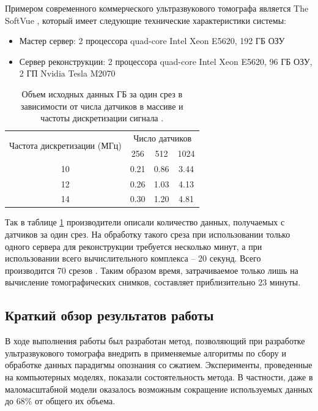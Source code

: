 \documentclass[14pt]{matmex-diploma-custom}
\begin{document}
Примером современного коммерческого ультразвукового томографа является The SoftVue \cite{roy2013breast}, который имеет следующие технические характеристики системы:
\begin{itemize}
\item Мастер сервер: 2 процессора quad-core Intel Xeon E5620, 192 ГБ ОЗУ
\item Сервер реконструкции: 2 процессора quad-core Intel Xeon E5620, 96 ГБ ОЗУ, 2 ГП Nvidia Tesla M2070
\end{itemize}

\begin{table}[h]
\centering
\begin{tabular}{ c | c | c | c }
    \hline
    \multirow{2}{*}{Частота дискретизации (МГц)} & \multicolumn{3}{c}{Число датчиков}  \\ \cline{2-4}
    & 256 & 512 & 1024 \\

    \hline
    10 & 0.21 & 0.86 & 3.44 \\
    12 & 0.26 & 1.03 & 4.13 \\
    14 & 0.30 & 1.20 & 4.81 \\
    \hline
\end{tabular}
\caption{\small Объем исходных данных ГБ за один срез в зависимости от числа датчиков в массиве и частоты дискретизации сигнала \cite{roy2013breast}.}
\label{table:datasize_ex}
\end{table}
Так в таблице \ref{table:datasize_ex} производители описали количество данных, получаемых с датчиков за один срез. На обработку такого среза при использовании только одного сервера для реконструкции требуется несколько минут, а при использовании всего вычислительного комплекса -- 20 секунд. Всего производится 70 срезов \cite{roy2013breast}. Таким образом время, затрачиваемое только лишь на вычисление томографических снимков, составляет приблизительно $23$ минуты.

\subsection{Краткий обзор результатов работы}

В ходе выполнения работы был разработан метод, позволяющий при разработке ультразвукового томографа внедрить в применяемые алгоритмы по сбору и обработке данных парадигмы опознания со сжатием. Эксперименты, проведенные на компьютерных моделях, показали состоятельность метода. В частности, даже в маломасштабной модели оказалось возможным сокращение используемых данных до 68\% от общего их объема.
\end{document}
